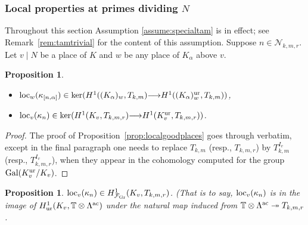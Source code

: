 \documentclass[12pt]{amsart}
\numberwithin{equation}{section}
\newtheorem{prop}[thm]{Proposition}
\begin{document}
\subsubsection{Local properties at primes dividing $N$}
Throughout this section Assumption \ref{assume:specialtam} is in effect; see Remark~\ref{rem:tamtrivial} for the content of this assumption. Suppose $n\in {\mathcal{N}}_{k,m,r}$. Let $v\mid N$ be a place of $K$ and $w$ be any place of $K_\alpha$ above $v$.
\begin{prop}$\,$
\label{prop:localatN}
\begin{itemize}
\item[(i)] $\textup{loc}_w(\kappa_{[n,\alpha]}) \in \ker(H^1((K_\alpha)_w,T_{k,m}){\longrightarrow} H^1((K_\alpha)_w^{\textup{ur}},T_{k,m}))$,
\item[(ii)] $\textup{loc}_v(\kappa_{n}) \in \ker(H^1(K_v,T_{k,m,r}){\longrightarrow} H^1(K_v^{\textup{ur}},T_{k,m,r}))$.
\end{itemize}
\end{prop}
\begin{proof}
The proof of Proposition~\ref{prop:localgoodplaces} goes through verbatim, except in the final paragraph one needs to replace $T_{k,m}$ (resp., $T_{k,m,r}$) by $T_{k,m}^{I_v}$ (resp., $T_{k,m,r}^{I_v}$), when they appear in the cohomology computed for the group $\textup{Gal}(K_v^{\textup{ur}}/K_v)$.
\end{proof}
\begin{prop}
\label{prop:localatN2}
$\textup{loc}_v(\kappa_n) \in H^1_{{\mathcal{F}}_{\textup{Gr}}}(K_v,T_{k,m,r})$. (That is to say, $\textup{loc}_v(\kappa_n)$ is in the image of $H^1_{\textup{ur}}(K_v,{\mathbb{T}}\otimes{\Lambda}^{\textup{ac}})$ under the natural map induced from ${\mathbb{T}}\otimes{\Lambda}^{\textup{ac}} \twoheadrightarrow T_{k,m,r}$.
\end{prop}
\end{document}
